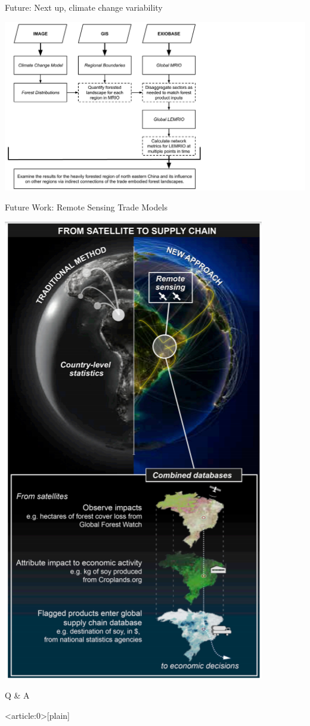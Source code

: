 \begin{frame}{Future: Next up, climate change variability}

\begin{center}\includegraphics[width=0.1\linewidth]{images/lemrio_climate_workflow} \end{center}

\end{frame}

\begin{frame}{Future Work: Remote Sensing Trade Models}

\begin{center}\includegraphics[width=0.1\linewidth]{images/Moran_2020_Fig1} \end{center}

\end{frame}

\begin{frame}{Q \& A}

\end{frame}

{ %
    \begin{frame}<article:0>[plain]
      \frametitle{}
     \end{frame}
}



